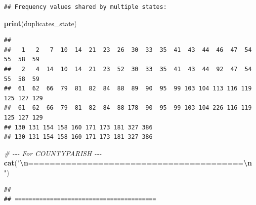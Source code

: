 \documentclass[
]{article}
\newenvironment{Shaded}{\begin{snugshade}}{\end{snugshade}}
\newcommand{\CommentTok}[1]{\textcolor[rgb]{0.56,0.35,0.01}{\textit{#1}}}
\newcommand{\DecValTok}[1]{\textcolor[rgb]{0.00,0.00,0.81}{#1}}
\newcommand{\FunctionTok}[1]{\textcolor[rgb]{0.13,0.29,0.53}{\textbf{#1}}}
\newcommand{\NormalTok}[1]{#1}
\newcommand{\OtherTok}[1]{\textcolor[rgb]{0.56,0.35,0.01}{#1}}
\newcommand{\SpecialCharTok}[1]{\textcolor[rgb]{0.81,0.36,0.00}{\textbf{#1}}}
\newcommand{\StringTok}[1]{\textcolor[rgb]{0.31,0.60,0.02}{#1}}
\begin{document}
\begin{Shaded}
\end{Shaded}

\begin{verbatim}
## Frequency values shared by multiple states:
\end{verbatim}

\begin{Shaded}
\begin{Highlighting}[]
\FunctionTok{print}\NormalTok{(duplicates\_state)}
\end{Highlighting}
\end{Shaded}

\begin{verbatim}
## 
##   1   2   7  10  14  21  23  26  30  33  35  41  43  44  46  47  54  55  58  59 
##   2   4  14  10  14  21  23  52  30  33  35  41  43  44  92  47  54  55  58  59 
##  61  62  66  79  81  82  84  88  89  90  95  99 103 104 113 116 119 125 127 129 
##  61  62  66  79  81  82  84  88 178  90  95  99 103 104 226 116 119 125 127 129 
## 130 131 154 158 160 171 173 181 327 386 
## 130 131 154 158 160 171 173 181 327 386
\end{verbatim}

\begin{Shaded}
\begin{Highlighting}[]
\CommentTok{\# {-}{-}{-} For COUNTYPARISH {-}{-}{-}}
\FunctionTok{cat}\NormalTok{(}\StringTok{"}\SpecialCharTok{\textbackslash{}n}\StringTok{========================================}\SpecialCharTok{\textbackslash{}n}\StringTok{"}\NormalTok{)}
\end{Highlighting}
\end{Shaded}

\begin{verbatim}
## 
## ========================================
\end{verbatim}
\end{document}
